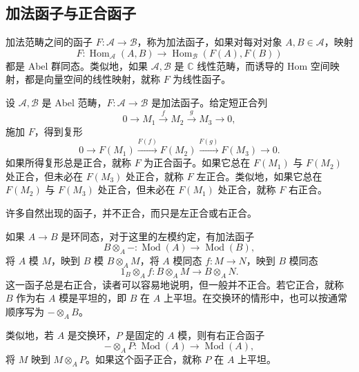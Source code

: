 \subsection{加法函子与正合函子}\label{sec:4.1.5}

\begin{definition*}\label{def:4.additive-linear-functor}
加法范畴之间的函子 $F\colon\mathcal{A}\to\mathcal{B}$，称为加法函子，如果对每对对象 $A,B\in\mathcal{A}$，映射
\[
F\colon\operatorname{Hom}_{\mathcal{A}}(A,B)
\longrightarrow\operatorname{Hom}_{\mathcal{B}}(F(A),F(B))
\]
都是 Abel 群同态。类似地，如果 $\mathcal{A},\mathcal{B}$ 是 $\mathbb{C}$ 线性范畴，而诱导的 Hom 空间映射，都是向量空间的线性映射，就称 $F$ 为线性函子。
\end{definition*}

\begin{definition*}\label{def:4.exact-functor}
设 $\mathcal{A},\mathcal{B}$ 是 Abel 范畴，$F\colon\mathcal{A}\to\mathcal{B}$ 是加法函子。给定短正合列
\[
0\longrightarrow M_1\xrightarrow{f}M_2\xrightarrow{g}M_3\longrightarrow0,
\]
施加 $F$，得到复形
\[
0\longrightarrow F(M_1)\xrightarrow{F(f)}F(M_2)
\xrightarrow{F(g)}F(M_3)\longrightarrow0.
\]
如果所得复形总是正合，就称 $F$ 为正合函子。如果它总在 $F(M_1)$ 与 $F(M_2)$ 处正合，但未必在 $F(M_3)$ 处正合，就称 $F$ 左正合。类似地，如果它总在 $F(M_2)$ 与 $F(M_3)$ 处正合，但未必在 $F(M_1)$ 处正合，就称 $F$ 右正合。
\end{definition*}
许多自然出现的函子，并不正合，而只是左正合或右正合。

\begin{example}\label{ex:4.24}
如果 $A\to B$ 是环同态，对于这里的左模约定，有加法函子
\[
B\otimes_A-\colon\operatorname{Mod}(A)\longrightarrow\operatorname{Mod}(B),
\]
将 $A$ 模 $M$，映到 $B$ 模 $B\otimes_AM$，将 $A$ 模同态 $f\colon M\to N$，映到 $B$ 模同态
\[
1_B\otimes_Af\colon B\otimes_AM\longrightarrow B\otimes_AN.
\]
这一函子总是右正合，读者可以容易地说明，但一般并不正合。若它正合，就称 $B$ 作为右 $A$ 模是平坦的，即 $B$ 在 $A$ 上平坦。在交换环的情形中，也可以按通常顺序写为 $-\otimes_AB$。

类似地，若 $A$ 是交换环，$P$ 是固定的 $A$ 模，则有右正合函子
\[
-\otimes_AP\colon\operatorname{Mod}(A)\longrightarrow\operatorname{Mod}(A),
\]
将 $M$ 映到 $M\otimes_AP$。如果这个函子正合，就称 $P$ 在 $A$ 上平坦。
\end{example}


